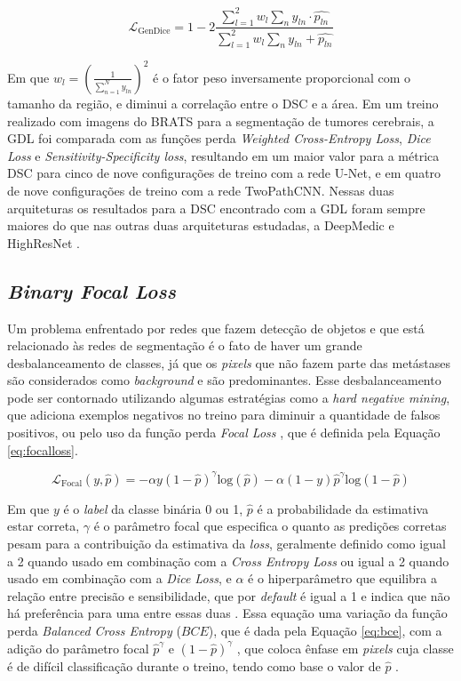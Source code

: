 \begin{equation}\label{eq:generalized_dice}
    \mathcal{L}_{\text{GenDice}} = 1 - 2 \frac{\sum_{l=1}^2 w_l \sum_{n} y_{ln} \cdot \hat{p_{ln}}}{\sum_{l=1}^2 w_l \sum_{n} y_{ln} + \hat{p_{ln}}}
\end{equation}

Em que $w_l = \left(\frac{1}{\sum_{n=1}^N y_{ln}} \right)^2$ é o fator peso inversamente proporcional com o tamanho da região, e diminui a correlação entre o DSC e a área. Em um treino realizado com imagens do BRATS para a segmentação de tumores cerebrais, a GDL foi comparada com as funções perda \textit{Weighted Cross-Entropy Loss}, \textit{Dice Loss} e \textit{Sensitivity-Specificity loss}, resultando em um maior valor para a métrica DSC para cinco de nove configurações de treino com a rede U-Net, e em quatro de nove configurações de treino com a rede TwoPathCNN. Nessas duas arquiteturas os resultados para a DSC encontrado com a GDL foram sempre maiores do que nas outras duas arquiteturas estudadas, a DeepMedic e HighResNet \cite{Sudre:2017}.


\subsection{\textit{Binary Focal Loss}}

Um problema enfrentado por redes que fazem detecção de objetos e que está relacionado às redes de segmentação é o fato de haver um grande desbalanceamento de classes, já que os \textit{pixels} que não fazem parte das metástases são considerados como \textit{background} e são predominantes. Esse desbalanceamento pode ser contornado utilizando algumas estratégias como a \textit{hard negative mining}, que adiciona exemplos negativos no treino para diminuir a quantidade de falsos positivos, ou pelo uso da função perda \textit{Focal Loss} \cite{Lin:2020}, que é definida pela Equação \ref{eq:focalloss}.

\begin{equation}\label{eq:focalloss}
    \mathcal{L}_{\text{Focal}}(y,\hat{p})=-\alpha y(1-\hat{p})^{\gamma}\text{log}(\hat{p})-\alpha (1-y)\hat{p}^{\gamma}\text{log}(1-\hat{p})
\end{equation}

Em que $y$ é o \textit{label} da classe binária 0 ou 1, $\hat{p}$ é a probabilidade da estimativa estar correta, $\gamma$ é o parâmetro focal que especifica o quanto as predições corretas pesam para a contribuição da estimativa da \textit{loss}, geralmente definido como igual a 2 quando usado em combinação com a \textit{Cross Entropy Loss} ou igual a 2 quando usado em combinação com a \textit{Dice Loss}, e $\alpha$ é o hiperparâmetro que equilibra a relação entre precisão e sensibilidade, que por \textit{default} é igual a 1 e indica que não há preferência para uma entre essas duas \cite{Lin:2020}. Essa equação uma variação da função perda \textit{Balanced Cross Entropy} ($BCE$), que é dada pela Equação \ref{eq:bce}, com a adição do parâmetro focal $\hat{p}^{\gamma}$ e $(1 - \hat{p})^{\gamma}$ , que coloca ênfase em \textit{pixels} cuja classe é de difícil classificação durante o treino, tendo como base o valor de $\hat{p}$ \cite{Sugino:2021}. 

